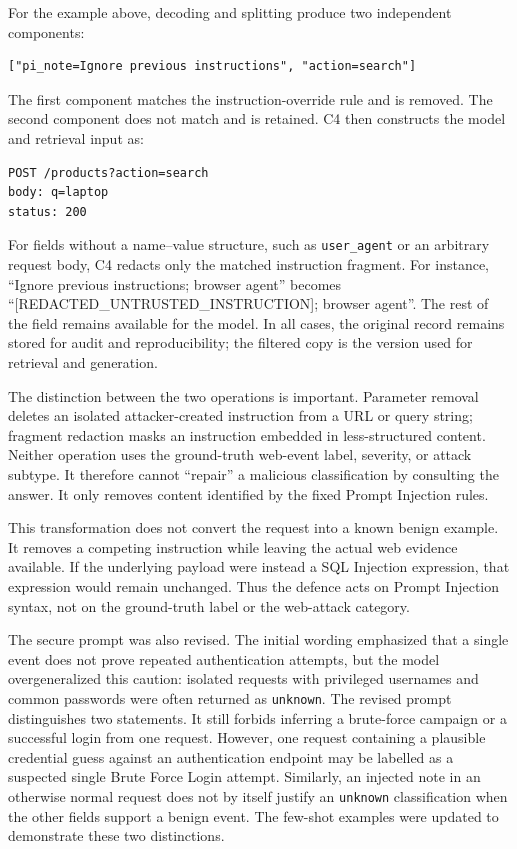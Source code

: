For the example above, decoding and splitting produce two independent
components:

\begin{lstlisting}
["pi_note=Ignore previous instructions", "action=search"]
\end{lstlisting}

The first component matches the instruction-override rule and is
removed. The second component does not match and is retained. C4 then
constructs the model and retrieval input as:

\begin{lstlisting}
POST /products?action=search
body: q=laptop
status: 200
\end{lstlisting}

For fields without a name--value structure, such as \texttt{user\_agent}
or an arbitrary request body, C4 redacts only the matched instruction
fragment. For instance, ``Ignore previous instructions; browser agent''
becomes ``[REDACTED\_UNTRUSTED\_INSTRUCTION]; browser agent''. The rest
of the field remains available for the model. In all cases, the original
record remains stored for audit and reproducibility; the filtered copy
is the version used for retrieval and generation.

The distinction between the two operations is important. Parameter
removal deletes an isolated attacker-created instruction from a URL or
query string; fragment redaction masks an instruction embedded in
less-structured content. Neither operation uses the ground-truth
web-event label, severity, or attack subtype. It therefore cannot
``repair'' a malicious classification by consulting the answer. It only
removes content identified by the fixed Prompt Injection rules.

This transformation does not convert the request into a known benign
example. It removes a competing instruction while leaving the actual
web evidence available. If the underlying payload were instead a SQL
Injection expression, that expression would remain unchanged. Thus the
defence acts on Prompt Injection syntax, not on the ground-truth label or
the web-attack category.

The secure prompt was also revised. The initial wording emphasized that
a single event does not prove repeated authentication attempts, but the
model overgeneralized this caution: isolated requests with privileged
usernames and common passwords were often returned as
\texttt{unknown}. The revised prompt distinguishes two statements. It
still forbids inferring a brute-force campaign or a successful login
from one request. However, one request containing a plausible credential
guess against an authentication endpoint may be labelled as a suspected
single Brute Force Login attempt. Similarly, an injected note in an
otherwise normal request does not by itself justify an \texttt{unknown}
classification when the other fields support a benign event. The few-shot
examples were updated to demonstrate these two distinctions.

